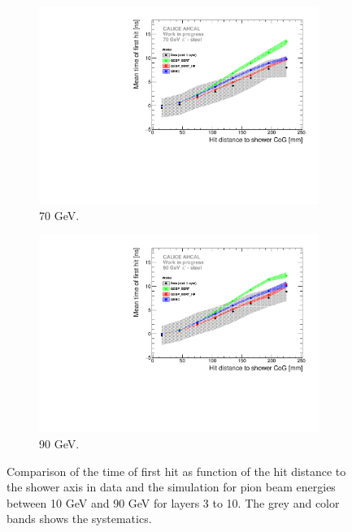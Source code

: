 \begin{figure}[htbp!]
\begin{subfigure}[t]{0.49\textwidth}
    \includegraphics[width=1\textwidth]{../Thesis_Plots/Timing/Pions/Plots/ComparisonToSim/Time_Radius_70GeV_SSF_Mokka.pdf}
    \caption{70 GeV.} \label{fig:Radius_SSF_SimData_70GeV}
  \end{subfigure}
  \hfill
  \begin{subfigure}[t]{0.49\textwidth}
    \centering
    \includegraphics[width=1\textwidth]{../Thesis_Plots/Timing/Pions/Plots/ComparisonToSim/Time_Radius_90GeV_SSF_Mokka.pdf}
    \caption{90 GeV.} \label{fig:Radius_SSF_SimData_90GeV}
  \end{subfigure}
  \caption{Comparison of the time of first hit as function of the hit distance to the shower axis in data and the \mokka simulation for pion beam energies between 10 GeV and 90 GeV for layers 3 to 10. The grey and color bands shows the systematics.}
\end{figure}

